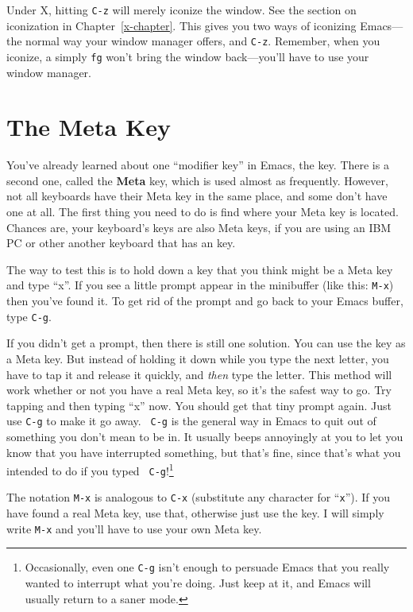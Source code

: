 \xwarn Under X, hitting {\tt C-z} will merely iconize the window. See
the section on iconization in Chapter~\ref{x-chapter}. This gives you
two ways of iconizing Emacs---the normal way your window manager
offers, and {\tt C-z}. Remember, when you iconize, a simply {\tt fg}
won't bring the window back---you'll have to use your window manager.

\section{The Meta Key}

You've already learned about one ``modifier key'' in Emacs, the
 key.  There is a second one, called the {\bf Meta}
key, which is used almost as frequently.  However, not all keyboards
have their Meta key in the same place, and some don't have one at all.
The first thing you need to do is find where your Meta key is located.
Chances are, your keyboard's  keys are also Meta keys, if
you are using an IBM PC or other another keyboard that has an
 key.

        The way to test this is to hold down a key that you think
might be a Meta key and type ``x''.  If you see a little prompt appear
in the minibuffer (like this: {\tt M-x}) then you've found it.  To get
rid of the prompt and go back to your Emacs buffer, type {\tt C-g}.

If you didn't get a prompt, then there is still one solution.  You can
use the  key as a Meta key.  But instead of holding it
down while you type the next letter, you have to tap it and release it
quickly, and {\em then\/} type the letter.  This method will work
whether or not you have a real Meta key, so it's the safest way to go.
Try tapping  and then typing ``x'' now.  You should get
that tiny prompt again.  Just use {\tt C-g} to make it go away.  {\tt
  C-g} is the general way in Emacs to quit
out of something you don't mean to be in.  It usually beeps annoyingly
at you to let you know that you have interrupted something, but that's
fine, since that's what you intended to do if you typed {\tt
  C-g}\/!\footnote{Occasionally, even one {\tt C-g} isn't enough to
  persuade Emacs that you really wanted to interrupt what you're
  doing. Just keep at it, and Emacs will usually return to a saner
  mode.}

         The notation {\tt M-x} is analogous to {\tt C-x} (substitute
any character for ``{\tt x}'').  If you have found a real Meta key,
use that, otherwise just use the  key.  I will simply
write {\tt M-x} and you'll have to use your own Meta key.


